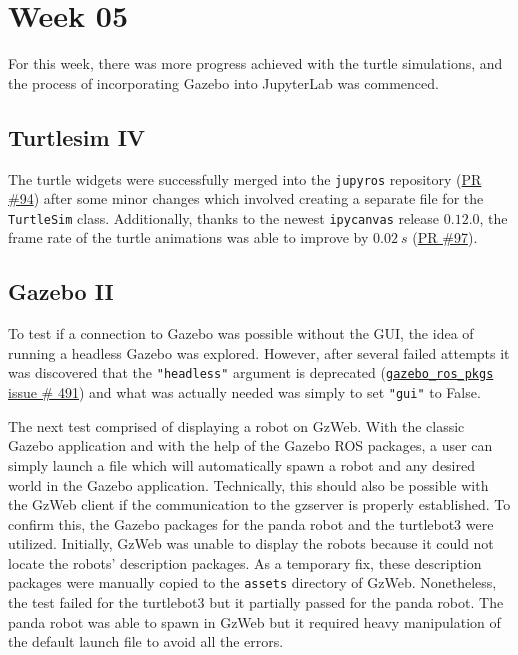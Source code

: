 \chapter{Week 05}

    For this week, there was more progress achieved with the turtle simulations, and the process of incorporating Gazebo into JupyterLab was commenced. 

\section{Turtlesim IV}
    
    The turtle widgets were successfully merged into the \texttt{jupyros} repository (\href{https://github.com/RoboStack/jupyter-ros/pull/94}{PR \#94}) after some minor changes which involved creating a separate file for the \texttt{TurtleSim} class. Additionally, thanks to the newest \texttt{ipycanvas} release $0.12.0$, the frame rate of the turtle animations was able to improve by $0.02\ s$ (\href{https://github.com/RoboStack/jupyter-ros/pull/97}{PR \#97}). 


\section{Gazebo II}

    To test if a connection to Gazebo was possible without the GUI, the idea of running a headless Gazebo was explored. However, after several failed attempts it was discovered that the \texttt{"headless"} argument is deprecated (\href{https://github.com/ros-simulation/gazebo_ros_pkgs/issues/491}{\texttt{gazebo\_ros\_pkgs} issue \# 491}) and what was actually needed was simply to set \texttt{"gui"} to False.

    The next test comprised of displaying a robot on GzWeb. With the classic Gazebo application and with the help of the Gazebo ROS packages, a user can simply launch a file which will automatically spawn a robot and any desired world in the Gazebo application. Technically, this should also be possible with the GzWeb client if the communication to the gzserver is properly established. To confirm this, the Gazebo packages for the panda robot and the turtlebot3 were utilized. Initially, GzWeb was unable to display the robots because it could not locate the robots' description packages. As a temporary fix, these description packages were manually copied to the \texttt{assets} directory of GzWeb. Nonetheless, the test failed for the turtlebot3 but it partially passed for the panda robot. The panda robot was able to spawn in GzWeb but it required heavy manipulation of the default launch file to avoid all the errors.
    
